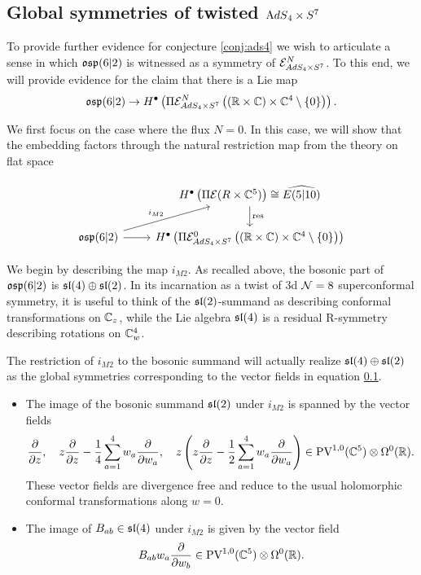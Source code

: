 \subsection{Global symmetries of twisted ${\mathrm{A}dS}_4 \times S^7$}

To provide further evidence for conjecture \ref{conj:ads4} we wish to articulate a sense in which $\mathfrak{osp}(6|2)$ is witnessed as a symmetry of $\mathcal{E}^N_{AdS_4\times S^7}$. To this end, we will provide evidence for the claim that there is a Lie map 
\[\mathfrak{osp}(6|2)\to H^\bullet \left ( \Pi \mathcal{E}^N_{AdS_4\times S^7} \left ( (\mathbb{R}\times \mathbb{C}) \times \mathbb{C}^4\setminus \{0\} \right ) \right ).\]

We first focus on the case where the flux $N=0$. In this case, we will show that the embedding factors through the natural restriction map from the theory on flat space

\[ 
\begin{tikzcd}
& H^\bullet \left ( \Pi \mc E (R\times \C^5)\right )\cong\widehat{E(5|10) }\ar[d, "\mr{res}"] \\
\mf{osp}(6|2)\ar[ur, "i_{M2}"]\ar[r] & H^\bullet \left ( \Pi \mc E^0_{AdS_4\times S^7} \left ( (\R\times \C) \times \C^4\setminus \{0\} \right ) \right )
\end{tikzcd}
\]
\parsec[] 

We begin by describing the map $i_{M2}$. As recalled above, the bosonic part of $\mathfrak{osp}(6|2)$ is $\mathfrak{sl}(4)\oplus \mathfrak{sl}(2)$. In its incarnation as a twist of 3d $\mathcal{N}=8$ superconformal symmetry, it is useful to think of the $\mathfrak{sl}(2)$-summand as describing conformal transformations on $\mathbb{C}_z$, while the Lie algebra $\mathfrak{sl}(4)$ is a residual R-symmetry describing rotations on $\mathbb{C}^4_w$.

The restriction of $i_{M2}$ to the bosonic summand will actually realize $\mathfrak{sl}(4)\oplus \mathfrak{sl}(2)$ as the global symmetries corresponding to the vector fields in equation \ref{}.
\begin{itemize}
\item The image of the bosonic summand $\mathfrak{sl}(2)$ under $i_{M2}$ is spanned by the vector fields
\[
\frac{\partial}{\partial z} ,\quad z \frac{\partial}{\partial z} - \frac14 \sum_{a=1}^4 w_a \frac{\partial}{\partial w_a} , \quad z \left(z \frac{\partial}{\partial z} - \frac12 \sum_{a=1}^4 w_a \frac{\partial}{\partial w_a} \right) \in \text{PV}^{1,0}(\mathbb{C}^5) \otimes \Omega^0(\mathbb{R}).
\]
These vector fields are divergence free and reduce to the usual holomorphic conformal transformations along $w=0$.
\item The image of $B_{ab}\in \mathfrak{sl}(4)$ under $i_{M2}$ is given by the vector field
\[
B_{ab} w_a \frac{\partial}{\partial w_b} \in \text{PV}^{1,0}(\mathbb{C}^5) \otimes \Omega^0(\mathbb{R}).
\]
\end{itemize}

